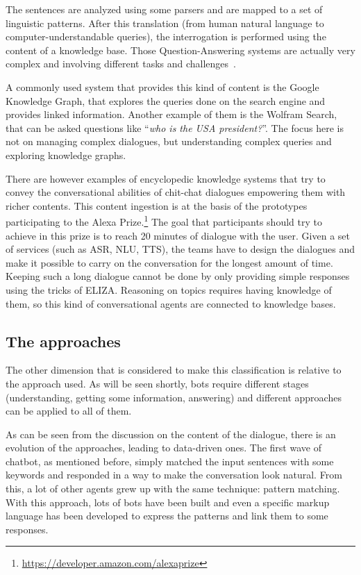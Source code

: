 The sentences are analyzed using some parsers and are mapped to a set of linguistic patterns. After this translation (from human natural language to computer-understandable queries), the interrogation is performed using the content of a knowledge base. Those Question-Answering systems are actually very complex and involving different tasks and challenges~\cite{hoffner2017survey}.

A commonly used system that provides this kind of content is the Google Knowledge Graph, that explores the queries done on the search engine and provides linked information. Another example of them is the Wolfram Search, that can be asked questions like ``\textit{who is the USA president?}''. The focus here is not on managing complex dialogues, but understanding complex queries and exploring knowledge graphs.

There are however examples of encyclopedic knowledge systems that try to convey the conversational abilities of chit-chat dialogues empowering them with richer contents. This content ingestion is at the basis of the prototypes participating to the Alexa Prize.\footnote{\url{https://developer.amazon.com/alexaprize}} The goal that participants should try to achieve in this prize is to reach 20 minutes of dialogue with the user. Given a set of services (such as ASR, NLU, TTS), the teams have to design the dialogues and make it possible to carry on the conversation for the longest amount of time. Keeping such a long dialogue cannot be done by only providing simple responses using the tricks of ELIZA. Reasoning on topics requires having knowledge of them, so this kind of conversational agents are connected to knowledge bases.

\subsection{The approaches}
\label{soaClassificationApproaches}

The other dimension that is considered to make this classification is relative to the approach used. As will be seen shortly, bots require different stages (understanding, getting some information, answering) and different approaches can be applied to all of them.

As can be seen from the discussion on the content of the dialogue, there is an evolution of the approaches, leading to data-driven ones. The first wave of chatbot, as mentioned before, simply matched the input sentences with some keywords and responded in a way to make the conversation look natural. From this, a lot of other agents grew up with the same technique: pattern matching. With this approach, lots of bots have been built and even a specific markup language has been developed to express the patterns and link them to some responses.

